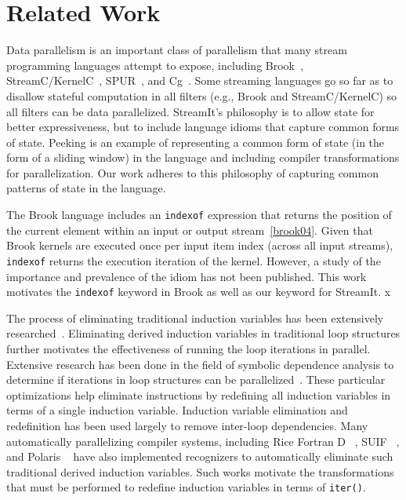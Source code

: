 \section{Related Work}
\label{sec:related}

Data parallelism is an important class of parallelism that many stream
programming languages attempt to expose, including
Brook~\cite{brook04}, StreamC/KernelC~\cite{imagine03ieee},
SPUR~\cite{spur05samos}, and Cg~\cite{cg03}.  Some streaming languages
go so far as to disallow stateful computation in all filters (e.g.,
Brook and StreamC/KernelC) so all filters can be data parallelized.
StreamIt's philosophy is to allow state for better expressiveness, but to
include language idioms that capture common forms of state.  Peeking
is an example of representing  a common form of state (in the form
of a sliding window) in the language and including compiler
transformations for parallelization.  Our work adheres to this
philosophy of capturing common patterns of state in the language.

The Brook language includes an {\tt indexof} expression that returns
the position of the current element within an input or output
stream~\ref{brook04}.  Given that Brook kernels are executed once per
input item index (across all input streams), {\tt indexof} returns the
execution iteration of the kernel.  However, a study of the importance
and prevalence of the idiom has not been published.  This work
motivates the {\tt indexof} keyword in Brook as well as our \iter
keyword for StreamIt.  x

The process of eliminating traditional induction variables has been
extensively researched~\cite{Bacon:1994,RM99:RRV}.  Eliminating
derived induction variables in traditional loop structures further
motivates the effectiveness of running the loop iterations in
parallel.  Extensive research has been done in the field of symbolic
dependence analysis to determine if iterations in loop structures can
be parallelized~\cite{Maydan:1991,Blume:1994}.  These particular
optimizations help eliminate instructions by redefining all induction
variables in terms of a single induction variable.  Induction variable
elimination and redefinition has been used largely to remove
inter-loop dependencies.  Many automatically parallelizing compiler
systems, including Rice Fortran D ~\cite{Hiranandani:1992}, SUIF
~\cite{Wilson:1994}, and Polaris ~\cite{Blume:1996} have also
implemented recognizers to automatically eliminate such traditional
derived induction variables.  Such works motivate the transformations
that must be performed to redefine induction variables in terms of
{\tt iter()}.


